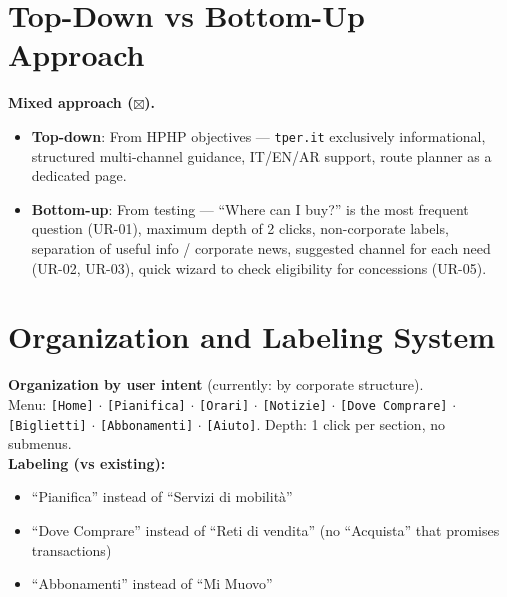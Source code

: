 ﻿\documentclass[11pt,a4paper]{article}
\begin{document}
\section{Top-Down vs Bottom-Up Approach}

\begin{tcolorbox}[rffield]
\small
\textbf{Mixed approach ($\boxtimes$).}
\begin{itemize}[nosep]
  \item \textbf{Top-down}: From HPHP objectives --- \texttt{tper.it} exclusively informational, structured multi-channel guidance, IT/EN/AR support, route planner as a dedicated page.
  \item \textbf{Bottom-up}: From testing --- ``Where can I buy?'' is the most frequent question (UR-01), maximum depth of 2 clicks, non-corporate labels, separation of useful info / corporate news, suggested channel for each need (UR-02, UR-03), quick wizard to check eligibility for concessions (UR-05).
\end{itemize}
\end{tcolorbox}

\section{Organization and Labeling System}

\begin{tcolorbox}[rffield]
\small
\textbf{Organization by user intent} (currently: by corporate structure). \\

\noindent Menu: \texttt{[Home]} $\cdot$ \texttt{[Pianifica]} $\cdot$ \texttt{[Orari]} $\cdot$ \texttt{[Notizie]} $\cdot$ \texttt{[Dove Comprare]} $\cdot$ \texttt{[Biglietti]} $\cdot$ \texttt{[Abbonamenti]} $\cdot$ \texttt{[Aiuto]}. Depth: 1 click per section, no submenus. \\

\noindent\textbf{Labeling (vs existing):}
\begin{itemize}[nosep]
  \item ``Pianifica'' instead of ``Servizi di mobilit\`a''
  \item ``Dove Comprare'' instead of ``Reti di vendita'' (no ``Acquista'' that promises transactions)
  \item ``Abbonamenti'' instead of ``Mi Muovo''
\end{itemize}
\end{tcolorbox}
\end{document}

